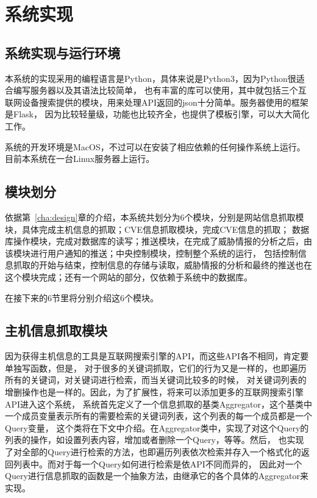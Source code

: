 \chapter{系统实现}
\label{cha:implementation}

\section{系统实现与运行环境}
\label{sec:env}

本系统的实现采用的编程语言是Python，具体来说是Python3，因为Python很适合编写服务器以及其语法比较简单，
也有丰富的库可以使用，其中就包括三个互联网设备搜索提供的模块，用来处理API返回的json十分简单。服务器使用的框架是Flask\cite{grinberg2018flask}，
因为比较轻量级，功能也比较齐全，也提供了模板引擎，可以大大简化工作。

系统的开发环境是MacOS，不过可以在安装了相应依赖的任何操作系统上运行。目前本系统在一台Linux服务器上运行。

\section{模块划分}
\label{sec:modules}

依据第~\ref{cha:design}章的介绍，本系统共划分为6个模块，分别是网站信息抓取模块，具体完成主机信息的抓取；CVE信息抓取模块，完成CVE信息的抓取；
数据库操作模块，完成对数据库的读写；推送模块，在完成了威胁情报的分析之后，由该模块进行用户通知的推送；中央控制模块，控制整个系统的运行，
包括控制信息抓取的开始与结束，控制信息的存储与读取，威胁情报的分析和最终的推送也在这个模块完成；还有一个网站的部分，仅依赖于系统中的数据库。

在接下来的6节里将分别介绍这6个模块。

\section{主机信息抓取模块}
\label{sec:hosts-module}

因为获得主机信息的工具是互联网搜索引擎的API，而这些API各不相同，肯定要单独写函数，但是，
对于很多的关键词抓取，它们的行为又是一样的，也即遍历所有的关键词，对关键词进行检索，而当关键词比较多的时候，
对关键词列表的增删操作也是一样的。因此，为了扩展性，将来可以添加更多的互联网搜索引擎API进入这个系统，
系统首先定义了一个信息抓取的基类Aggregator，这个基类中一个成员变量表示所有的需要检索的关键词列表，这个列表的每一个成员都是一个Query变量，
这个类将在下文中介绍。在Aggregator类中，实现了对这个Query的列表的操作，如设置列表内容，增加或者删除一个Query，等等。然后，
也实现了对全部的Query进行检索的方法，也即遍历列表依次检索并存入一个格式化的返回列表中。而对于每一个Query如何进行检索是依API不同而异的，
因此对一个Query进行信息抓取的函数是一个抽象方法，由继承它的各个具体的Aggregator来实现。

